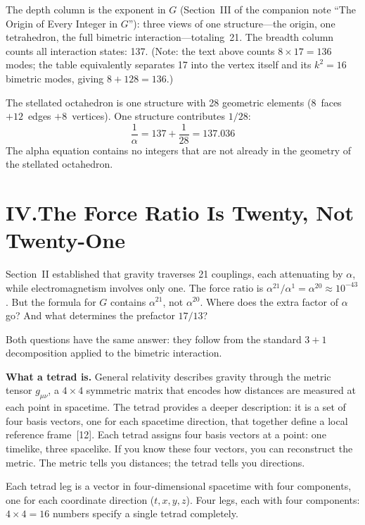\documentclass[11pt]{article}
\begin{document}
The depth column is the exponent in $G$ (Section~III of the companion note ``The Origin of Every Integer in $G$''): three views of one structure---the origin, one tetrahedron, the full bimetric interaction---totaling~21.
The breadth column counts all interaction states: 137.
(Note: the text above counts $8 \times 17 = 136$ modes; the table equivalently separates 17 into the vertex itself and its $k^2 = 16$ bimetric modes, giving $8 + 128 = 136$.)

The stellated octahedron is one structure with 28 geometric elements ($8$~faces $+ 12$~edges $+ 8$~vertices).
One structure contributes $1/28$:
%
\begin{equation*}
\frac{1}{\alpha} = 137 + \frac{1}{28} = 137.036
\end{equation*}
%
The alpha equation contains no integers that are not already in the geometry of the stellated octahedron.

\section*{IV.\quad The Force Ratio Is Twenty, Not Twenty-One}

Section~II established that gravity traverses 21 couplings, each attenuating by $\alpha$, while electromagnetism involves only one.
The force ratio is $\alpha^{21}/\alpha^{1} = \alpha^{20} \approx 10^{-43}$.
But the formula for $G$ contains $\alpha^{21}$, not $\alpha^{20}$.
Where does the extra factor of $\alpha$ go?
And what determines the prefactor $17/13$?

Both questions have the same answer: they follow from the standard $3+1$ decomposition applied to the bimetric interaction.

\textbf{What a tetrad is.}\quad
General relativity describes gravity through the metric tensor $g_{\mu\nu}$, a $4 \times 4$ symmetric matrix that encodes how distances are measured at each point in spacetime.
The tetrad provides a deeper description: it is a set of four basis vectors, one for each spacetime direction, that together define a local reference frame~[12].
Each tetrad assigns four basis vectors at a point: one timelike, three spacelike.
If you know these four vectors, you can reconstruct the metric.
The metric tells you distances; the tetrad tells you directions.

Each tetrad leg is a vector in four-dimensional spacetime with four components, one for each coordinate direction ($t, x, y, z$).
Four legs, each with four components: $4 \times 4 = 16$ numbers specify a single tetrad completely.
\end{document}
